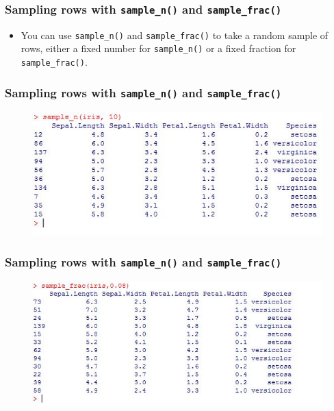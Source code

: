 \documentclass{beamer}
\begin{document}
	
	\begin{frame}
		\frametitle{Sampling rows with \texttt{sample\_n()} and \texttt{sample\_frac()}}
		\begin{itemize}
			\item You can use \texttt{sample\_n()} and \texttt{sample\_frac()} to take a random sample of rows, either a fixed number for \texttt{sample\_n()} or a fixed fraction for \texttt{sample\_frac()}.
		\end{itemize}
	\end{frame}
	
	\begin{frame}
		\frametitle{Sampling rows with \texttt{sample\_n()} and \texttt{sample\_frac()}}
		
		\begin{figure}
			\centering
			\includegraphics[width=1.07\linewidth]{images/irissample1}
		\end{figure}
		
	\end{frame}
	\begin{frame}
		\frametitle{Sampling rows with \texttt{sample\_n()} and \texttt{sample\_frac()}}
		
		\begin{figure}
			\centering
			\includegraphics[width=1.07\linewidth]{images/irissample2}
		\end{figure}
		
	\end{frame}
\end{document}
